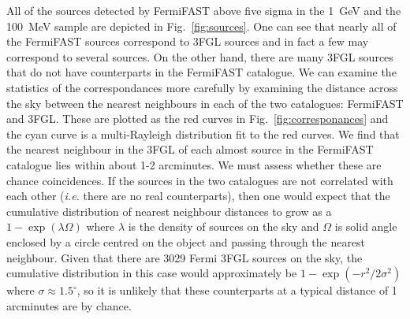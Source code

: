\documentclass[useAMS,usenatbib]{mn2e}
\begin{document}
All of the sources detected by FermiFAST above five sigma in the 1~GeV
and the 100~MeV sample are depicted in Fig.~\ref{fig:sources}.  One
can see that nearly all of the FermiFAST sources correspond to 3FGL
sources and in fact a few may correspond to several sources.  On the
other hand, there are many 3FGL sources that do not have counterparts
in the FermiFAST catalogue.  We can examine the statistics of the
correspondances more carefully by examining the distance across the
sky between the nearest neighbours in each of the two catalogues:
FermiFAST and 3FGL.  These are plotted as the red curves in
Fig.~\ref{fig:corresponances} and the cyan curve is a multi-Rayleigh
distribution fit to the red curves.  We find that the nearest
neighbour in the 3FGL of each almost source in the FermiFAST catalogue
lies within about 1-2 arcminutes.  We must assess whether these are
chance coincidences.  If the sources in the two catalogues are not
correlated with each other ({\em i.e.} there are no real counterparts),
then one would expect that the cumulative distribution of nearest
neighbour distances to grow as a $1-\exp(\lambda \Omega)$ where
$\lambda$ is the density of sources on the sky and $\Omega$ is solid
angle enclosed by a circle centred on the object and passing through
the nearest neighbour.  Given that there are 3029 Fermi 3FGL sources
on the sky, the cumulative distribution in this case would
approximately be $1-\exp(-r^2/2\sigma^2)$ where $\sigma\approx
1.5^\circ$, so it is unlikely that these counterparts at a typical
distance of 1 arcminutes are by chance.
\end{document}
